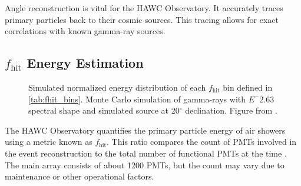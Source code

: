 Angle reconstruction is vital for the HAWC Observatory.
It accurately traces primary particles back to their cosmic sources.
This tracing allows for exact correlations with known gamma-ray sources.

\subsection{$f_\mathrm{hit}$ Energy Estimation}\label{sec:hawc_fhit}

\begin{figure}
    \caption{Simulated normalized energy distribution of each $f_\mathrm{hit}$ bin defined in \cref{tab:fhit_bins}. Monte Carlo simulation of gamma-rays with $E^-{2.63}$ spectral shape and simulated source at 20$^\circ$ declination. Figure from \cite{Abeysekara_2017}.}
    \label{fig:fhit_bins}
\end{figure}



The HAWC Observatory quantifies the primary particle energy of air showers using a metric known as $f_{\text{hit}}$.
This ratio compares the count of PMTs involved in the event reconstruction to the total number of functional PMTs at the time \cite{Abeysekara_2017}.
The main array consists of about 1200 PMTs, but the count may vary due to maintenance or other operational factors.

